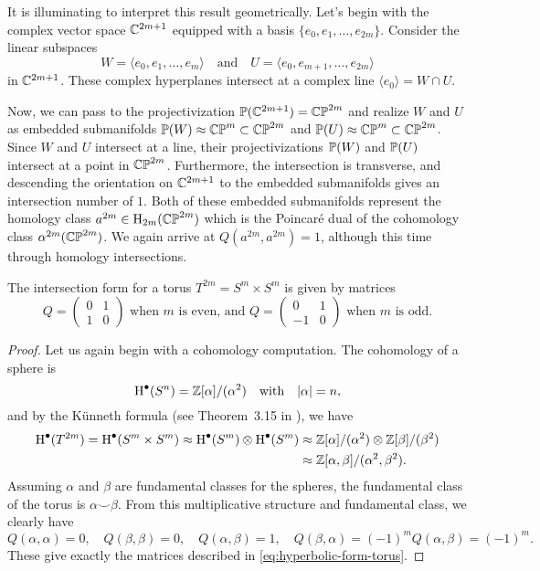 It is illuminating to interpret this result geometrically. Let's begin with the complex vector space $\C^{2m+1}$ equipped with a basis $\{e_0, e_1,\ldots, e_{2m}\}$. Consider the linear subspaces
\[
	W = \langle e_0, e_1,\ldots, e_m\rangle \quad\textrm{and}\quad U = \langle e_0, e_{m+1},\ldots, e_{2m}\rangle
\]
in $\C^{2m+1}$. These complex hyperplanes intersect at a complex line $\langle e_0 \rangle = W\cap U$.

Now, we can pass to the projectivization $\P(\C^{2m+1})=\CP^{2m}$ and realize $W$ and $U$ as embedded submanifolds $\P(W)\approx \CP^m\subset \CP^{2m}$ and $\P(U)\approx \CP^m\subset \CP^{2m}$. Since $W$ and $U$ intersect at a line, their projectivizations $\P(W)$ and $\P(U)$ intersect at a point in $\CP^{2m}$. Furthermore, the intersection is transverse, and descending the orientation on $\C^{2m+1}$ to the embedded submanifolds gives an intersection number of $1$. Both of these embedded submanifolds represent the homology class $a^{2m}\in \H_{2m}(\CP^{2m})$ which is the Poincar\'e dual of the cohomology class $\alpha^{2m}(\CP^{2m})$. We again arrive at $Q(a^{2m}, a^{2m})=1$, although this time through homology intersections.

\begin{proposition}\label{prop:intersection-form-torus}
	The intersection form for a torus $T^{2m}=S^m\times S^m$ is given by matrices
	\begin{equation}\label{eq:hyperbolic-form-torus}
		Q = \begin{pmatrix}0 & 1 \\ 1 & 0\end{pmatrix}
		\textrm{ when }m\textrm{ is even, and }
		Q = \begin{pmatrix}0 & 1 \\ -1 & 0\end{pmatrix}
		\textrm{ when }m\textrm{ is odd.}
	\end{equation}
\end{proposition}
\begin{proof}
	Let us again begin with a cohomology computation. The cohomology of a sphere is
	\[
		\H^\bullet(S^n) = \Z[\alpha]/(\alpha^2)\quad\textrm{with}\quad |\alpha| = n,
	\]
	and by the K\"unneth formula (see Theorem~3.15 in \cite{hatcher2002topology}), we have
	\[
		\begin{aligned}
			\H^\bullet(T^{2m})=\H^\bullet(S^m\times S^m)\cong \H^\bullet(S^m)\otimes \H^\bullet(S^m)
			 & \cong \Z[\alpha]/(\alpha^2)\otimes \Z[\beta]/(\beta^2) \\
			 & \cong \Z[\alpha,\beta]/(\alpha^2,\beta^2).
		\end{aligned}
	\]
	Assuming $\alpha$ and $\beta$ are fundamental classes for the spheres, the fundamental class of the torus is $\alpha\smile \beta$. From this multiplicative structure and fundamental class, we clearly have
	\[
		Q(\alpha, \alpha)=0, \quad Q(\beta,\beta)=0, \quad Q(\alpha,\beta)=1,\quad Q(\beta,\alpha)=(-1)^m Q(\alpha,\beta)=(-1)^m.
	\]
	These give exactly the matrices described in \cref{eq:hyperbolic-form-torus}.
\end{proof}

